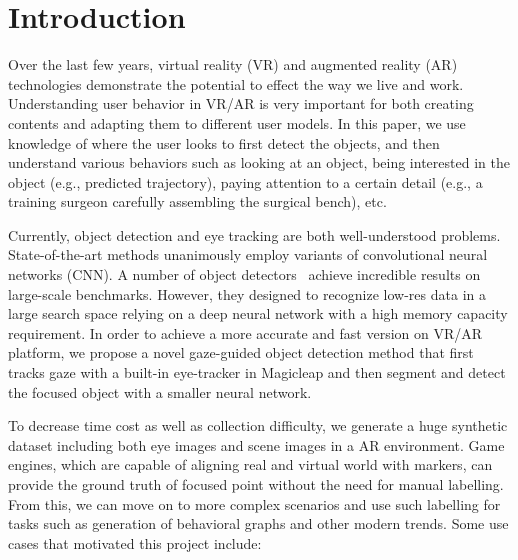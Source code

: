 \section{Introduction}

Over the last few years, virtual reality (VR) and augmented reality (AR)
technologies demonstrate the potential to effect the way we live and work.
Understanding user behavior in VR/AR is very important for both creating
contents and adapting them to different user models. In this paper, we use
knowledge of where the user looks to first detect the objects, and then
understand various behaviors such as looking at an object, being interested in
the object (e.g., predicted trajectory), paying attention to a certain detail
(e.g., a training surgeon carefully assembling the surgical bench), etc.

Currently, object detection and eye tracking are both well-understood problems.
State-of-the-art methods unanimously employ variants of convolutional neural
networks (CNN). A number of object detectors~\cite{redmon2016you, liu2016ssd,
lin2017focal, girshick2014rich, girshick2015fast, ren2015faster, he2017mask}
achieve incredible results on large-scale benchmarks. However, they designed to
recognize low-res data in a large search space relying on a deep neural network
with a high memory capacity requirement. In order to achieve a more accurate and
fast version on VR/AR platform, we propose a novel gaze-guided object detection
method that first tracks gaze with a built-in eye-tracker in Magicleap and then
segment and detect the focused object with a smaller neural network.

To decrease time cost as well as collection difficulty, we generate a huge
synthetic dataset including both eye images and scene images in a AR
environment. Game engines, which are capable of aligning real and virtual world
with markers, can provide the ground truth of focused point without the need for
manual labelling. From this, we can move on to more complex scenarios and use
such labelling for tasks such as generation of behavioral graphs and other
modern trends. Some use cases that motivated this project include:


